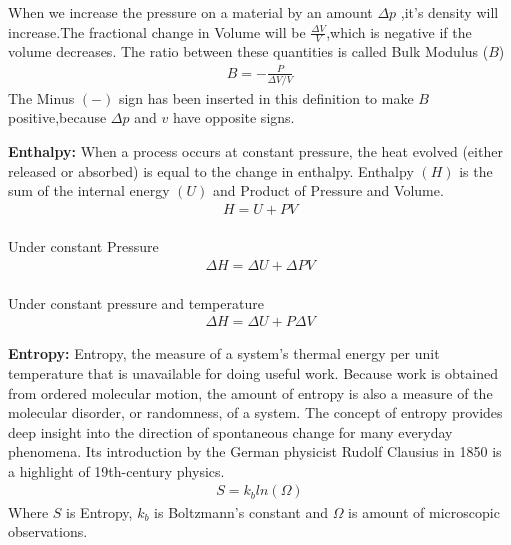 \begin{phybox}{}
    {When we increase the pressure on a material by an amount $\Delta p$ ,it's density will increase.The fractional change in Volume will be $\frac{\Delta V}{V}$,which is negative if the volume decreases. The ratio between these quantities is called Bulk Modulus ($B$)
    \begin{align*}
        B = -\frac{P}{\Delta V / V}
    \end{align*}
    The Minus $(-)$ sign has been inserted in this definition to make $B$ positive,because $\Delta p$ and $v$ have opposite signs.}
\end{phybox}
\begin{chembox}{}
    \textbf{Enthalpy:}
   {When a process occurs at constant pressure, the heat evolved (either released or absorbed) is equal to the change in enthalpy. Enthalpy $(H)$ is the sum of the internal energy $(U)$ and Product of Pressure and Volume.}
    \begin{align*}
        H = U + PV
    \end{align*}\\
    Under constant Pressure
    \begin{align*}
        \Delta H = \Delta U + \Delta PV
    \end{align*}\\
    Under constant pressure and temperature\\
    \begin{align*}
        \Delta H = \Delta U + P \Delta V
    \end{align*}

    \textbf{Entropy:}
   {Entropy, the measure of a system’s thermal energy per unit temperature that is unavailable for doing useful work. Because work is obtained from ordered molecular motion, the amount of entropy is also a measure of the molecular disorder, or randomness, of a system. The concept of entropy provides deep insight into the direction of spontaneous change for many everyday phenomena. Its introduction by the German physicist Rudolf Clausius in 1850 is a highlight of 19th-century physics.}
   \begin{align*}
    S=k_b ln(\Omega)
   \end{align*}
   {Where $S$ is Entropy, $k_b$ is Boltzmann's constant and $\Omega$ is amount of microscopic observations.}
   \end{chembox}
